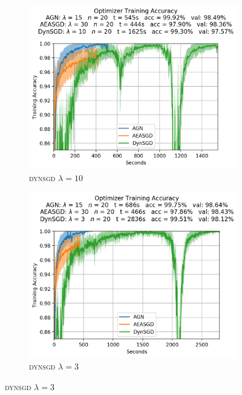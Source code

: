 \begin{figure}[H]
  \centering
  \begin{subfigure}{.49\textwidth}
    \centering
      \includegraphics[width=\textwidth]{resources/images/agn_experiment_1}
      \caption{\textsc{dynsgd} $\lambda = 10$}
  \end{subfigure}
  \begin{subfigure}{.49\textwidth}
    \centering
      \includegraphics[width=\textwidth]{resources/images/agn_experiment_2}
      \caption{\textsc{dynsgd} $\lambda = 3$}
  \end{subfigure}

\end{figure}
